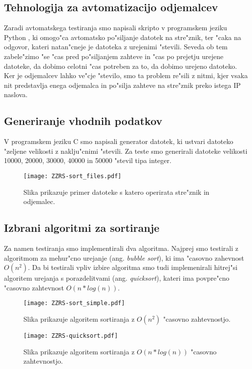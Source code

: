 \subsection{Tehnologija za avtomatizacijo odjemalcev}
Zaradi avtomatskega testiranja smo napisali skripto v programskem jeziku Python \cite{8_py}, ki omogo"ca avtomatsko po"siljanje datotek na stre"znik, ter "caka na odgovor, kateri natan"cneje je datoteka z urejenimi "stevili. Seveda ob tem zabele"zimo "se "cas pred po"siljanjem zahteve in "cas po prejetju urejene datoteke, da dobimo celotni "cas potreben za to, da dobimo urejeno datoteko. Ker je odjemalcev lahko ve"cje "stevilo, smo ta problem re"sili z nitmi, kjer vsaka nit predstavlja enega odjemalca in po"silja zahteve na stre"znik preko istega IP naslova.

\subsection{Generiranje vhodnih podatkov}
V programskem jeziku C smo napisali generator datotek, ki ustvari datoteko "zeljene velikosti z naklju"cnimi "stevili. Za teste smo generirali datoteke velikosti 10000, 20000, 30000, 40000 in 50000 "stevil tipa integer.

\begin{figure} [!h]
  \centering
    \texttt{[image: ZZRS-sort\_files.pdf]} 
  \caption{Slika prikazuje primer datoteke s katero operirata stre"znik in odjemalec.}
  \label{8_files}  
\end{figure}

\subsection{Izbrani algoritmi za sortiranje}
Za namen testiranja smo implementirali dva algoritma. Najprej smo testirali z algoritmom za mehur"cno urejanje (ang. \textit{bubble sort}), ki ima "casovno zahevnost $O(n^2)$.
Da bi testirali vpliv izbire algoritma smo tudi implemenirali hitrej"si algoritem urejanja s porazdelitvami (ang. \textit{quicksort}), kateri ima povpre"cno "casovno zahtevnost $O(n* log(n))$.

\begin{figure}  [!h]
  \centering
    \texttt{[image: ZZRS-sort\_simple.pdf]}
  \caption{Slika prikazuje algoritem sortiranja z $O(n^2)$ "casovno zahtevnostjo.}
  \label{8_sort}  
\end{figure}

\begin{figure}  [!h]
	\centering
	\texttt{[image: ZZRS-quicksort.pdf]}
	\caption{Slika prikazuje algoritem sortiranja z $O(n* log(n))$ "casovno zahtevnostjo.}
	\label{8_quicksort}  
\end{figure}

